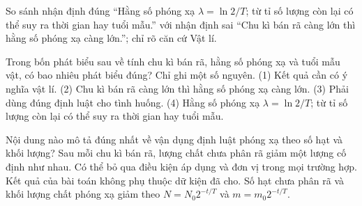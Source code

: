 \begin{bt}
So sánh nhận định đúng “Hằng số phóng xạ $\lambda=\ln2/T$; từ tỉ số lượng còn lại có thể suy ra thời gian hay tuổi mẫu.” với nhận định sai “Chu kì bán rã càng lớn thì hằng số phóng xạ càng lớn.”; chỉ rõ căn cứ Vật lí.
\end{bt}

\begin{ex}
Trong bốn phát biểu sau về tính chu kì bán rã, hằng số phóng xạ và tuổi mẫu vật, có bao nhiêu phát biểu đúng? Chỉ ghi một số nguyên. (1) Kết quả cần có ý nghĩa vật lí. (2) Chu kì bán rã càng lớn thì hằng số phóng xạ càng lớn. (3) Phải dùng đúng định luật cho tình huống. (4) Hằng số phóng xạ $\lambda=\ln2/T$; từ tỉ số lượng còn lại có thể suy ra thời gian hay tuổi mẫu.
\end{ex}

\begin{ex}
Nội dung nào mô tả đúng nhất về vận dụng định luật phóng xạ theo số hạt và khối lượng?
\choice
{Sau mỗi chu kì bán rã, lượng chất chưa phân rã giảm một lượng cố định như nhau.}
{Có thể bỏ qua điều kiện áp dụng và đơn vị trong mọi trường hợp.}
{Kết quả của bài toán không phụ thuộc dữ kiện đã cho.}
{\True Số hạt chưa phân rã và khối lượng chất phóng xạ giảm theo $N=N_0 2^{-t/T}$ và $m=m_0 2^{-t/T}$.}
\end{ex}

